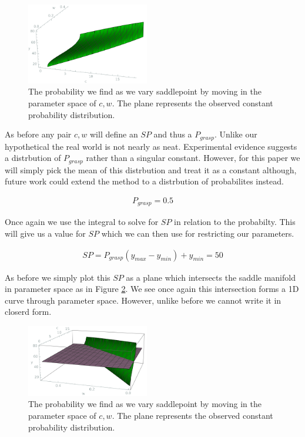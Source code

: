 \documentclass[letterpaper]{article}
\begin{document}
\begin{figure}[t]
\begin{center}
\includegraphics[width=2.1in,angle=0]{./saddle_prehension.png}
\caption{The probability we find as we vary saddlepoint by moving in the 
parameter space of $c,w$. The plane represents the observed constant probability 
distribution.}
\label{prehension_saddle}
\end{center}
\end{figure}

As before any pair $c,w$ will define an $SP$ and thus a $P_{grasp}$. Unlike 
our hypothetical the real world is not nearly as neat. Experimental evidence suggests
a distrbution of $P_{grasp}$ rather than a singular constant. However, for this paper
we will simply pick the mean of this distrbution and treat it as a constant although,
future work could extend the method to a distrbution of probabilites instead.

\begin{eqnarray}
  P_{grasp} = 0.5
\end{eqnarray}

Once again we use the integral to solve for $SP$ in relation to the probabilty. This
will give us a value for $SP$ which we can then use for restricting our parameters.

\begin{eqnarray}
  SP = P_{grasp}(y_{max}-y_{min}) + y_{min} = 50
\end{eqnarray}

As before we simply plot this $SP$ as a plane which intersects the saddle manifold
in parameter space as in Figure \ref{prehension_h}. We see once again this intersection
forms a 1D curve through parameter space. However, unlike before we cannot write it 
in closerd form.

\begin{figure}[t]
\begin{center}
\includegraphics[width=2.1in,angle=0]{./prehension_h.png}
\caption{The probability we find as we vary saddlepoint by moving in the 
parameter space of $c,w$. The plane represents the observed constant probability 
distribution.}
\label{prehension_h}
\end{center}
\end{figure}
\end{document}
